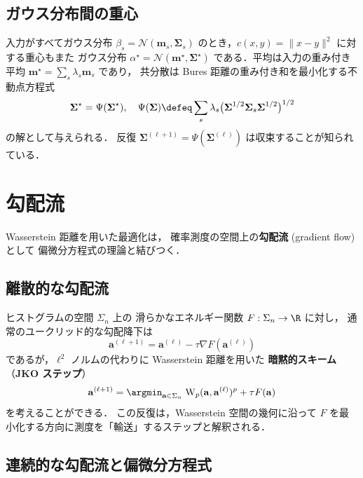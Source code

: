\subsection{ガウス分布間の重心}\label{subsec:gaussian-barycenter}

入力がすべてガウス分布
$\beta_s = \mathcal{N}(\mathbf{m}_s, \boldsymbol{\Sigma}_s)$
のとき，$c(x,y) = \|x-y\|^2$ に対する重心もまた
ガウス分布 $\alpha^\star = \mathcal{N}(\mathbf{m}^\star, \boldsymbol{\Sigma}^\star)$
である．平均は入力の重み付き平均
$\mathbf{m}^\star = \sum_s \lambda_s \mathbf{m}_s$ であり，
共分散は Bures 距離の重み付き和を最小化する不動点方程式
\[
  \boldsymbol{\Sigma}^\star = \Psi(\boldsymbol{\Sigma}^\star),
  \quad
  \Psi(\boldsymbol{\Sigma}) \defeq
  \sum_s \lambda_s
  \bigl(\boldsymbol{\Sigma}^{1/2} \boldsymbol{\Sigma}_s \boldsymbol{\Sigma}^{1/2}\bigr)^{1/2}
\]
の解として与えられる．
反復 $\boldsymbol{\Sigma}^{(\ell+1)} = \Psi(\boldsymbol{\Sigma}^{(\ell)})$
は収束することが知られている．


\section{勾配流}\label{sec:gradient-flow}

Wasserstein 距離を用いた最適化は，
確率測度の空間上の\textbf{勾配流} (gradient flow) として
偏微分方程式の理論と結びつく．

\subsection{離散的な勾配流}\label{subsec:discrete-gf}

ヒストグラムの空間 $\Sigma_n$ 上の
滑らかなエネルギー関数 $F : \Sigma_n \to \R$ に対し，
通常のユークリッド的な勾配降下は
\[
  \mathbf{a}^{(\ell+1)} = \mathbf{a}^{(\ell)} - \tau \nabla F(\mathbf{a}^{(\ell)})
\]
であるが，$\ell^2$ ノルムの代わりに Wasserstein 距離を用いた
\textbf{暗黙的スキーム}（\textbf{JKO ステップ}）
\begin{equation}\label{eq:jko}
  \mathbf{a}^{(\ell+1)}
  = \argmin_{\mathbf{a} \in \Sigma_n}\;
  \mathrm{W}_p(\mathbf{a}, \mathbf{a}^{(\ell)})^p + \tau F(\mathbf{a})
\end{equation}
を考えることができる．
この反復は，Wasserstein 空間の幾何に沿って
$F$ を最小化する方向に測度を「輸送」するステップと解釈される．

\subsection{連続的な勾配流と偏微分方程式}\label{subsec:continuous-gf}

